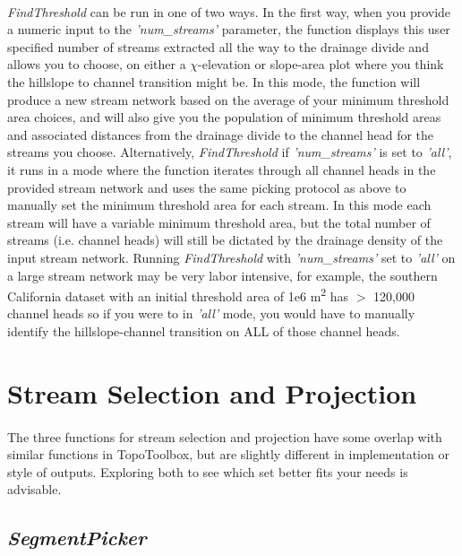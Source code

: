 \paragraph{}\textit{FindThreshold} can be run in one of two ways. In the first way, when you provide a numeric input to the \textit{'num\_streams'} parameter, the function displays this user specified number of streams extracted all the way to the drainage divide and allows you to choose, on either a $\chi$-elevation or slope-area plot where you think the hillslope to channel transition might be. In this mode, the function will produce a new stream network based on the average of your minimum threshold area choices, and will also give you the population of minimum threshold areas and associated distances from the drainage divide to the channel head for the streams you choose. Alternatively, \textit{FindThreshold} if \textit{'num\_streams'} is set to \textit{'all'}, it runs in a mode where the function iterates through all channel heads in the provided stream network and uses the same picking protocol as above to manually set the minimum threshold area for each stream. In this mode each stream will have a variable minimum threshold area, but the total number of streams (i.e. channel heads) will still be dictated by the drainage density of the input stream network. Running \textit{FindThreshold} with \textit{'num\_streams'} set to \textit{'all'} on a large stream network may be very labor intensive, for example, the southern California dataset with an initial threshold area of 1e6 m\textsuperscript{2} has $>$ 120,000 channel heads so if you were to in \textit{'all'} mode, you would have to manually identify the hillslope-channel transition on ALL of those channel heads.

\section{Stream Selection and Projection}

\paragraph{}The three functions for stream selection and projection have some overlap with similar functions in TopoToolbox, but are slightly different in implementation or style of outputs. Exploring both to see which set better fits your needs is advisable.

\subsection{\textit{SegmentPicker}} \label{sec:SegPick}
